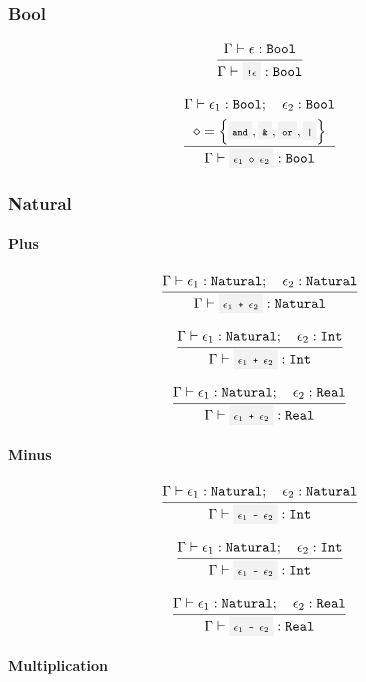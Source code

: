
\subsubsection{Bool}

\[
	\infrule{
		\EnvSym\then \expr:\Bool
	}{
		\EnvSym\then \code{!$\expr$}:\Bool
	}
\]

\[
	\infrule{
		\EnvSym\then \expr_1:\Bool \semiq \expr_2:\Bool \\*
		\bop = \set{\code{and}, \code{\&}, \code{or}, \code{|}}
	}{
		\EnvSym\then \code{$\expr_1$ $\bop$ $\expr_2$}:\Bool
	}
\]

\subsubsection{Natural}

\paragraph{Plus}

\[
	\infrule{
		\EnvSym\then \expr_1:\Natural \semiq \expr_2:\Natural
	}{
		\EnvSym\then \code{$\expr_1$ + $\expr_2$} : \Natural
	}
\]

\[
	\infrule{
		\EnvSym\then \expr_1:\Natural \semiq \expr_2:\Int
	}{
		\EnvSym\then \code{$\expr_1$ + $\expr_2$} : \Int
	}
\]

\[
	\infrule{
		\EnvSym\then \expr_1:\Natural \semiq \expr_2:\Real
	}{
		\EnvSym\then \code{$\expr_1$ + $\expr_2$} : \Real
	}
\]

\paragraph{Minus}

\[
	\infrule{
		\EnvSym\then \expr_1:\Natural \semiq \expr_2:\Natural
	}{
		\EnvSym\then \code{$\expr_1$ - $\expr_2$} : \Int
	}
\]


\[
	\infrule{
		\EnvSym\then \expr_1:\Natural \semiq \expr_2:\Int
	}{
		\EnvSym\then \code{$\expr_1$ - $\expr_2$} : \Int
	}
\]

\[
	\infrule{
		\EnvSym\then \expr_1:\Natural \semiq \expr_2:\Real
	}{
		\EnvSym\then \code{$\expr_1$ - $\expr_2$} : \Real
	}
\]

\paragraph{Multiplication}

